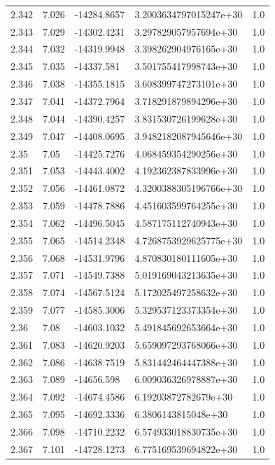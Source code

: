 \begin{tabular}{lllll}
2.342 & 7.026 & -14284.8657 & 3.2003634797015247e+30 & 1.0 \\
2.343 & 7.029 & -14302.4231 & 3.297829057957694e+30 & 1.0 \\
2.344 & 7.032 & -14319.9948 & 3.398262904976165e+30 & 1.0 \\
2.345 & 7.035 & -14337.581 & 3.501755417998743e+30 & 1.0 \\
2.346 & 7.038 & -14355.1815 & 3.608399747273101e+30 & 1.0 \\
2.347 & 7.041 & -14372.7964 & 3.718291879894296e+30 & 1.0 \\
2.348 & 7.044 & -14390.4257 & 3.831530726199628e+30 & 1.0 \\
2.349 & 7.047 & -14408.0695 & 3.9482182087945646e+30 & 1.0 \\
2.35 & 7.05 & -14425.7276 & 4.068459354290256e+30 & 1.0 \\
2.351 & 7.053 & -14443.4002 & 4.192362387833996e+30 & 1.0 \\
2.352 & 7.056 & -14461.0872 & 4.3200388305196766e+30 & 1.0 \\
2.353 & 7.059 & -14478.7886 & 4.451603599764255e+30 & 1.0 \\
2.354 & 7.062 & -14496.5045 & 4.587175112740943e+30 & 1.0 \\
2.355 & 7.065 & -14514.2348 & 4.7268753929625775e+30 & 1.0 \\
2.356 & 7.068 & -14531.9796 & 4.870830180111605e+30 & 1.0 \\
2.357 & 7.071 & -14549.7388 & 5.019169043213635e+30 & 1.0 \\
2.358 & 7.074 & -14567.5124 & 5.172025497258632e+30 & 1.0 \\
2.359 & 7.077 & -14585.3006 & 5.329537123373354e+30 & 1.0 \\
2.36 & 7.08 & -14603.1032 & 5.491845692653664e+30 & 1.0 \\
2.361 & 7.083 & -14620.9203 & 5.659097293768066e+30 & 1.0 \\
2.362 & 7.086 & -14638.7519 & 5.831442464447388e+30 & 1.0 \\
2.363 & 7.089 & -14656.598 & 6.009036326978887e+30 & 1.0 \\
2.364 & 7.092 & -14674.4586 & 6.19203872782679e+30 & 1.0 \\
2.365 & 7.095 & -14692.3336 & 6.3806143815048e+30 & 1.0 \\
2.366 & 7.098 & -14710.2232 & 6.574933018830735e+30 & 1.0 \\
2.367 & 7.101 & -14728.1273 & 6.775169539694822e+30 & 1.0 \\

\end{tabular}
